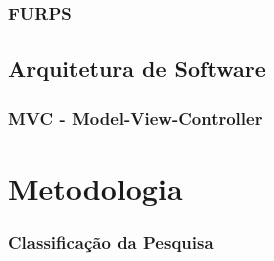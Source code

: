 \subsection{FURPS}


\section{Arquitetura de Software}

\subsection{MVC - Model-View-Controller}

\chapter{Metodologia}

\subsection{Classificação da Pesquisa}